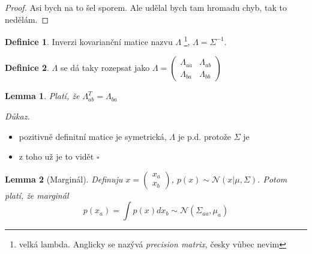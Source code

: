 \documentclass{article}
\newenvironment{pitemize}{
\begin{itemize}
  \setlength{\itemsep}{5pt}
  \setlength{\parskip}{0pt}
  \setlength{\parsep}{0pt}
}{\end{itemize}}
\newenvironment{pproof}{
\noindent\emph{Důkaz.}
\begin{pitemize}
}{\hfill$\square$\end{pitemize}}
\newcommand{\NN}{\mathcal{N}}
\newtheorem{lemma}{Lemma}
\theoremstyle{definition}
\newtheorem{definice}{Definice}
\begin{document}
\begin{proof}
Asi bych na to šel sporem. Ale udělal bych tam hromadu chyb, tak to nedělám.
\end{proof}

\begin{definice}
Inverzi kovarianční matice nazvu $\Lambda$ \footnote{velká lambda. Anglicky se nazývá \emph{precision matrix}, česky vůbec nevim}, $\Lambda=\Sigma^{-1}$.
\end{definice}

\begin{definice}
$\Lambda$ se dá taky rozepsat jako $\Lambda = \left(\begin{matrix}\Lambda_{aa}&\Lambda_{ab}\\\Lambda_{ba}&\Lambda_{bb} \end{matrix}\right)$
\end{definice}

\begin{lemma}
\label{lambdaprehozy}
Platí, že $\Lambda_{ab}^T=\Lambda_{ba}$
\end{lemma}
\begin{pproof}
\item pozitivně definitní matice je symetrická, $\Lambda$ je p.d. protože $\Sigma$ je
\item z toho už je to vidět
\end{pproof}

\begin{lemma}[Marginál]
\label{marginal}
Definuju $x=\left(\begin{matrix}x_a\\x_b \end{matrix}\right)$, $p(x)\sim\NN(x|\mu,\Sigma)$. Potom platí, že marginál $$p(x_a)=\int p(x) d x_b \sim \NN\left(\Sigma_{aa},\mu_a\right)$$
\end{lemma}
\end{document}
